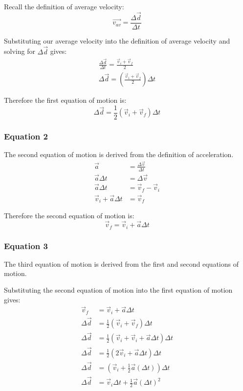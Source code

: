 \documentclass{article}
\begin{document}
Recall the definition of average velocity:
\begin{equation}
    \vec{v_{av}} = \frac{\Delta \vec{d}}{\Delta t}
\end{equation}

Substituting our average velocity into the definition of average velocity and solving for $\Delta \vec{d}$ gives:
\begin{align}
    \frac{\Delta \vec{d}}{\Delta t} =  \frac{\vec{v}_i + \vec{v}_f}{2} \\
    \Delta \vec{d} = \left(\frac{\vec{v}_i + \vec{v}_f}{2}\right)\Delta t
\end{align}

Therefore the first equation of motion is:
\begin{equation}
    \Delta \vec{d} = \frac{1}{2}(\vec{v}_i + \vec{v}_f)\Delta t
\end{equation}

\subsubsection{Equation 2}
The second equation of motion is derived from the definition of acceleration. 
\begin{align}
    \vec{a} &= \frac{\Delta \vec{v}}{\Delta t}\\
    \vec{a}\Delta t  &= \Delta \vec{v}\\
    \vec{a}\Delta t &= \vec{v}_f - \vec{v}_i \\ 
    \vec{v}_i + \vec{a}\Delta t &= \vec{v}_f 
\end{align}

Therefore the second equation of motion is:
\begin{equation}
    \vec{v}_f = \vec{v}_i + \vec{a}\Delta t
\end{equation}

\subsubsection{Equation 3}
The third equation of motion is derived from the first and second equations of motion.

Substituting the second equation of motion into the first equation of motion gives:
\begin{align}
    \vec{v}_f &= \vec{v}_i + \vec{a}\Delta t\\
    \Delta \vec{d} &= \frac{1}{2}(\vec{v}_i + \vec{v}_f )\Delta t\\
    \Delta \vec{d} &= \frac{1}{2}(\vec{v}_i + \vec{v}_i + \vec{a}\Delta t)\Delta t\\
    \Delta \vec{d} &= \frac{1}{2}(2\vec{v}_i + \vec{a}\Delta t)\Delta t\\
    \Delta \vec{d} &= (\vec{v}_i + \frac{1}{2}\vec{a}(\Delta t)) \Delta t \\
    \Delta \vec{d} &= \vec{v}_i\Delta t + \frac{1}{2}\vec{a}(\Delta t)^2
\end{align}
\end{document}
